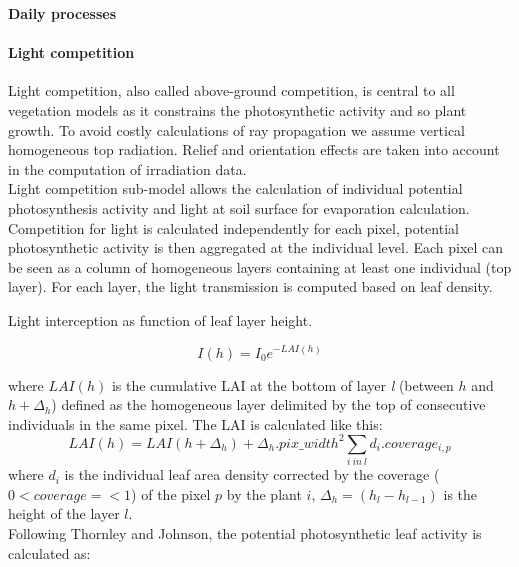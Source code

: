\textbf{Daily processes}

\paragraph{Light competition}Light competition, also called above-ground competition, is central to all vegetation models as it constrains the photosynthetic activity and so plant growth. To avoid costly calculations of ray propagation we assume vertical homogeneous top radiation. Relief and orientation effects are taken into account in the computation of irradiation data.\\
Light competition sub-model allows the calculation of individual potential photosynthesis activity and light at soil surface for evaporation calculation.\\
Competition for light is calculated independently for each pixel, potential photosynthetic activity is then aggregated at the individual level. Each pixel can be seen as a column of homogeneous layers containing at least one individual (top layer). For each layer, the light transmission is computed based on leaf density.


\begin{marginfigure}
\label{fig:derivaives}
\caption{Light interception as function of leaf layer height.}
\end{marginfigure}

\begin{equation}\label{eq:Ih}
I(h) =  I_{0} e^{-LAI(h)}
\end{equation}

where $LAI(h)$ is the cumulative LAI at the bottom of layer \textit{l} (between $h$ and $h+\Delta_{h}$) defined as the homogeneous layer delimited by the top of consecutive individuals in the same pixel. The LAI is calculated like this:
\begin{equation}\label{eq:LAI}
LAI(h) = LAI(h+\Delta_{h}) +   \Delta_{h} . pix\_width^{2} \sum_{i\ in\ l}d_{i}.coverage_{i, p}
\end{equation}
where $d_{i}$ is the individual leaf area density corrected by the coverage ($0< coverage =< 1$) of the pixel $p$ by the plant $i$, $\Delta_{h} = (h_{l} - h_{l-1})$ is the height of the layer $l$.\\
Following Thornley and Johnson, the potential photosynthetic leaf activity is calculated as:


